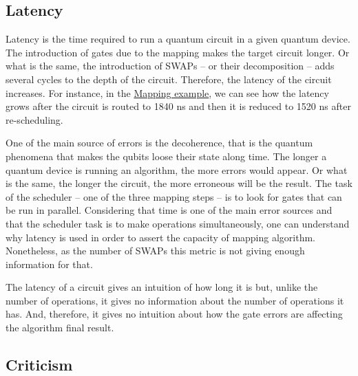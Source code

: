 \subsection{Latency}
\label{sec:org05c643c}

Latency is the time required to run a quantum circuit in a given quantum device.
The introduction of gates due to the mapping makes the target circuit longer.
Or what is the same, the introduction of SWAPs -- or their decomposition -- adds several cycles to the depth of the circuit.
Therefore, the latency of the circuit increases.
For instance, in the \hyperref[sec:org265b200]{Mapping example}, we can see how the latency grows after the circuit is routed to 1840 ns and then it is reduced to 1520 ns after re-scheduling.



One of the main source of errors is the decoherence, that is the quantum phenomena that makes the qubits loose their state along time.
The longer a quantum device is running an algorithm, the more errors would appear.
Or what is the same, the longer the circuit, the more erroneous will be the result.
The task of the scheduler -- one of the three mapping steps -- is to look for gates that can be run in parallel.
Considering that time is one of the main error sources and that the scheduler task is to make operations simultaneously, one can understand why latency is used in order to assert the capacity of mapping algorithm.
Nonetheless, as the number of SWAPs this metric is not giving enough information for that.

The latency of a circuit gives an intuition of how long it is but, unlike the number of operations, it gives no information about the number of operations it has.
And, therefore, it gives no intuition about how the gate errors are affecting the algorithm final result.

\subsection{Criticism}
\label{sec:org5a593de}

